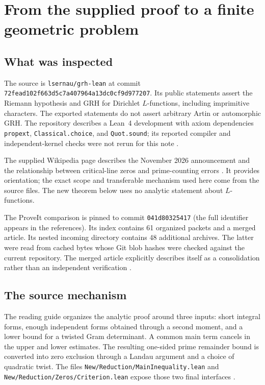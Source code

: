 \section{From the supplied proof to a finite geometric problem}
\label{sec:context}

\subsection{What was inspected}

The source is \texttt{lsernau/grh-lean} at commit
\texttt{72fead102f663d5c7a407964a13dc0cf9d977207}. Its public statements assert the Riemann hypothesis and GRH for Dirichlet $L$-functions, including imprimitive characters. The exported statements do not assert arbitrary Artin or automorphic GRH. The repository describes a Lean~4 development with axiom dependencies \texttt{propext}, \texttt{Classical.choice}, and \texttt{Quot.sound}; its reported compiler and independent-kernel checks were not rerun for this note \cite{grh}.

The supplied Wikipedia page describes the November 2026 announcement and the relationship between critical-line zeros and prime-counting errors \cite{wiki}. It provides orientation; the exact scope and transferable mechanism used here come from the source files. The new theorem below uses no analytic statement about $L$-functions.

The ProveIt comparison is pinned to commit \texttt{041d80325417}
(the full identifier appears in the references). Its index contains 61 organized packets and a merged article. Its nested incoming directory contains 48 additional archives. The latter were read from cached bytes whose Git blob hashes were checked against the current repository. The merged article explicitly describes itself as a consolidation rather than an independent verification \cite{proveit}.

\subsection{The source mechanism}

The reading guide organizes the analytic proof around three inputs: short integral forms, enough independent forms obtained through a second moment, and a lower bound for a twisted Gram determinant. A common main term cancels in the upper and lower estimates. The resulting one-sided prime remainder bound is converted into zero exclusion through a Landau argument and a choice of quadratic twist. The files \texttt{New/Reduction/MainInequality.lean} and \texttt{New/Reduction/Zeros/Criterion.lean} expose those two final interfaces \cite{grh}.

